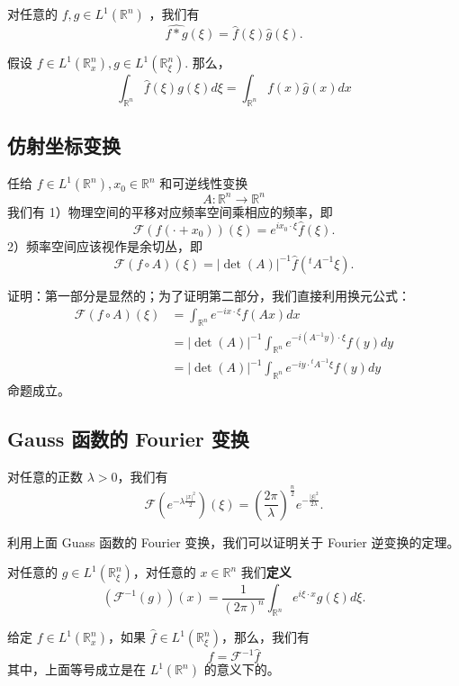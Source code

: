 \begin{theorem}[卷积对应于频率空间的乘积]
对任意的 $f, g \in L^1\left(\mathbb{R}^n\right)$ ，我们有
\[
\widehat{f * g}(\xi)=\widehat{f}(\xi) \widehat{g}(\xi) .
\]
\end{theorem}
\begin{proposition}
假设 $f \in L^1\left(\mathbb{R}_x^n\right), g \in L^1(\mathbb{R}_{\xi}^n)$. 那么，
\[
\int_{\mathbb{R}^n} \widehat{f}(\xi) g(\xi) d \xi=\int_{\mathbb{R}^n} f(x) \widehat{g}(x) d x
\]
\end{proposition}
\subsection{仿射坐标变换}

\begin{proposition}
任给 $f \in L^1\left(\mathbb{R}^n\right), x_0 \in \mathbb{R}^n$ 和可逆线性变换
\[
A: \mathbb{R}^n \rightarrow \mathbb{R}^n
\]我们有
1）物理空间的平移对应频率空间乘相应的频率，即
\[
\mathcal{F}\left(f\left(\cdot+x_0\right)\right)(\xi)=e^{i x_0 \cdot \xi} \widehat{f}(\xi) .
\]2）频率空间应该视作是余切丛，即
\[
\mathcal{F}(f \circ A)(\xi)=|\operatorname{det}(A)|^{-1} \widehat{f}\left({ }^t A^{-1} \xi\right) .
\]
\end{proposition}
证明：第一部分是显然的；为了证明第二部分，我们直接利用换元公式：
\[
\begin{aligned}
\mathcal{F}(f \circ A)(\xi) & =\int_{\mathbb{R}^n} e^{-i x \cdot \xi} f(A x) d x \\
& =|\operatorname{det}(A)|^{-1} \int_{\mathbb{R}^n} e^{-i\left(A^{-1} y\right) \cdot \xi} f(y) d y \\
& =|\operatorname{det}(A)|^{-1} \int_{\mathbb{R}^n} e^{-i y \cdot { }^t A^{-1} \xi} f(y) d y
\end{aligned}
\]
命题成立。

\subsection{Gauss 函数的 Fourier 变换}

\begin{theorem}
对任意的正数 $\lambda>0$，我们有
\[
\mathcal{F}\left(e^{-\lambda \frac{|x|^2}{2}}\right)(\xi)=\left(\frac{2 \pi}{\lambda}\right)^{\frac{n}{2}} e^{-\frac{|\xi|^2}{2 \lambda}} .
\]
\end{theorem}
利⽤上⾯ Guass 函数的 Fourier 变换，我们可以证明关于 Fourier 逆变换的定理。

\begin{definition}
对任意的 $g \in L^1\left(\mathbb{R}_{\xi}^n\right)$，对任意的 $x \in \mathbb{R}^n$ 我们\textbf{定义}
\[
\left(\mathcal{F}^{-1}(g)\right)(x)=\frac{1}{(2 \pi)^n} \int_{\mathbb{R}^n} e^{i \xi \cdot x} g(\xi) d \xi .
\]
\end{definition}
\begin{theorem}
给定 $f \in L^1\left(\mathbb{R}_x^n\right)$，如果 $\widehat{f} \in L^1\left(\mathbb{R}_{\xi}^n\right)$，那么，我们有
\[
f=\mathcal{F}^{-1} \widehat{f}
\]其中，上面等号成立是在 $L^1\left(\mathbb{R}^n\right)$ 的意义下的。
\end{theorem}
